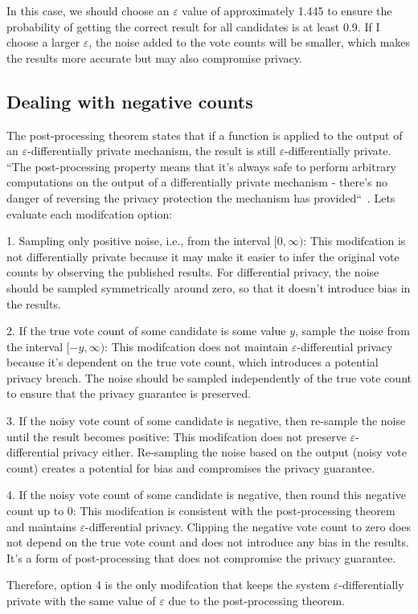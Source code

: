 In this case, we should choose an $\varepsilon$ value of approximately 1.445 to ensure the probability of getting the correct result for
all candidates is at least 0.9. If I choose a larger $\varepsilon$, the noise added to the vote counts will be smaller, which makes the
results more accurate but may also compromise privacy.



\subsection{Dealing with negative counts}

The post-processing theorem states that if a function is applied to the output of an $\varepsilon$-differentially private mechanism, the
result is still $\varepsilon$-differentially private. ``The post-processing property means that it’s always safe to perform arbitrary
computations on the output of a differentially private mechanism - there’s no danger of reversing the privacy protection the mechanism
has provided``~\cite[]{properties}. Lets evaluate each modifcation option:

1. Sampling only positive noise, i.e., from the interval $[0, \infty)$:
This modifcation is not differentially private because it may make it easier to infer the original vote counts by observing the published results. For differential privacy, the noise should be sampled symmetrically around zero, so that it doesn't introduce bias in the results.

2. If the true vote count of some candidate is some value $y$, sample the noise from the interval $[-y, \infty)$:
This modifcation does not maintain $\varepsilon$-differential privacy because it's dependent on the true vote count, which introduces a potential privacy breach. The noise should be sampled independently of the true vote count to ensure that the privacy guarantee is preserved.

3. If the noisy vote count of some candidate is negative, then re-sample the noise until the result becomes positive:
This modifcation does not preserve $\varepsilon$-differential privacy either. Re-sampling the noise based on the output (noisy vote count) creates a potential for bias and compromises the privacy guarantee.

4. If the noisy vote count of some candidate is negative, then round this negative count up to 0:
This modifcation is consistent with the post-processing theorem and maintains $\varepsilon$-differential privacy. Clipping the negative vote count to zero does not depend on the true vote count and does not introduce any bias in the results. It's a form of post-processing that does not compromise the privacy guarantee.

Therefore, option 4 is the only modifcation that keeps the system $\varepsilon$-differentially private with the same value of $\varepsilon$ due to the post-processing theorem.
